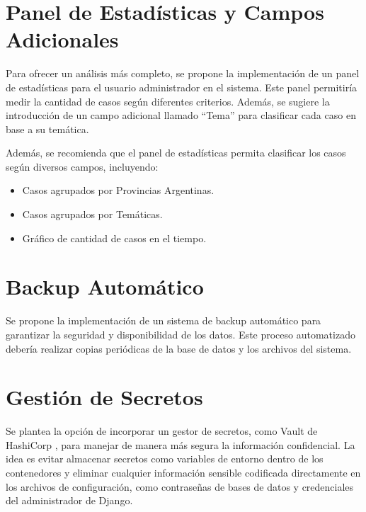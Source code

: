 \section{Panel de Estadísticas y Campos Adicionales}

Para ofrecer un análisis más completo, se propone la implementación de un panel de estadísticas para el usuario administrador en el sistema. Este panel permitiría medir la cantidad de casos según diferentes criterios. Además, se sugiere la introducción de un campo adicional llamado ``Tema'' para clasificar cada caso en base a su temática.

Además, se recomienda que el panel de estadísticas permita clasificar los casos según diversos campos, incluyendo:
\begin{itemize}
\item Casos agrupados por Provincias Argentinas.
\item Casos agrupados por Temáticas.
\item Gráfico de cantidad de casos en el tiempo.
\end{itemize}

\section{Backup Automático}
Se propone la implementación de un sistema de backup automático para garantizar la seguridad y disponibilidad de los datos. Este proceso automatizado debería realizar copias periódicas de la base de datos y los archivos del sistema.

\section{Gestión de Secretos}

Se plantea la opción de incorporar un gestor de secretos, como Vault de HashiCorp \cite{voult}, para manejar de manera más segura la información confidencial. La idea es evitar almacenar secretos como variables de entorno dentro de los contenedores y eliminar cualquier información sensible codificada directamente en los archivos de configuración, como contraseñas de bases de datos y credenciales del administrador de Django.
